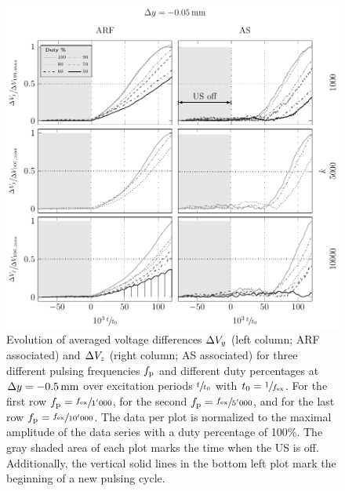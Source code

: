 \begin{figure}[tbp]
  \centering
  \includegraphics[]{External/PU-duty-m05.pdf}
  \caption{Evolution of averaged voltage differences $\Delta V_{y}$ (left column; 
    ARF associated) and $\Delta V_{z}$ (right column; AS associated) for three 
    different pulsing frequencies $f_{\mathrm{p}}$ and different duty percentages at 
    $\Dy=\SI{-0.5}{\mm}$ over excitation periods $\sfrac{t}{t_{0}}$ with 
    $t_{0}=\sfrac{1}{f_{\mathrm{ex}}}$. For the first row $f_{\mathrm{p}}=\sfrac{f_{\mathrm{ex}}}{1'000}$, for 
    the second $f_{\mathrm{p}}=\sfrac{f_{\mathrm{ex}}}{5'000}$, and for the last row 
    $f_{\mathrm{p}}=\sfrac{f_{\mathrm{ex}}}{10'000}$. The data per plot is normalized to the maximal 
    amplitude of the data series with a duty percentage of 100\%. The gray 
    shaded area of each plot marks the time when the US is off. Additionally, 
    the vertical solid lines in the bottom left plot mark the beginning of a 
    new pulsing cycle.
}\label{fig:PU-duty-m05}
\end{figure}

